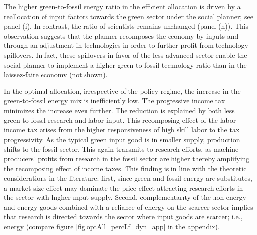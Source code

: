 The higher green-to-fossil energy ratio in the efficient allocation is driven by a reallocation of input factors towards the green sector under the social planner; see panel (i). In contrast, the ratio of scientists remains unchanged (panel (h)). This observation suggests that the planner recomposes the economy by inputs and through an adjustment in technologies in order to further profit from technology spillovers. In fact, these spillovers in favor of the less advanced sector enable the social planner to implement a higher green to fossil technology ratio than in the laissez-faire economy (not shown). 

In the optimal allocation, irrespective of the policy regime, the increase in the green-to-fossil energy mix is inefficiently low. The progressive income tax minimizes the increase even further. The reduction is explained by both less green-to-fossil research and labor input. This recomposing effect of the labor income tax arises from the higher responsiveness of high skill labor to the tax progressivity. As the typical green input good is in smaller supply, production shifts to the fossil sector. This again transmits to research efforts, as machine producers' profits from research in the fossil sector are higher thereby amplifying the recomposing effect of income taxes. This finding is in line with the theoretic considerations in the literature: first,  since green and fossil energy are substitutes, a market size effect may dominate the price effect attracting research efforts in the sector with higher input supply. Second, complementarity of the non-energy and energy goods combined with a reliance of energy on the scarcer sector implies that research is directed towards the sector where input goods are scarcer; i.e., energy (compare figure \ref{fig:optAll_percLf_dyn_app} in the appendix). 

